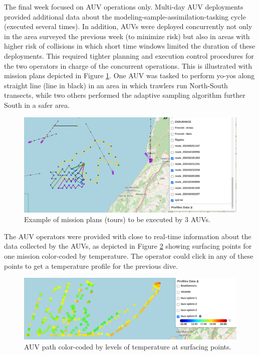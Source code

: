 The final week focused on AUV operations only. Multi-day AUV deployments
provided additional data about the modeling-sample-assimilation-tasking
cycle (executed several times). In addition, AUVs were deployed
concurrently not only in the area surveyed the previous week (to
minimize risk) but also in areas with higher risk of collisions in which
short time windows limited the duration of these deployments. This
required tighter planning and execution control procedures for the two
operators in charge of the concurrent operations. This is illustrated
with mission plans depicted in Figure \ref{fig:missionplans}. One AUV
was tasked to perform yo-yos along straight line (line in black) in an
area in which trawlers run North-South transects, while two others
performed the adaptive sampling algorithm further South in a safer area.
 
\begin{figure}
    \centering
    \includegraphics[width=.7\linewidth]{fig/missionplans.png}
    \caption{Example of mission plans (tours) to be executed by 3 AUVs.}
    \label{fig:missionplans}
\end{figure}


The AUV operators were provided with close to real-time information
about the data collected by the AUVs, as depicted in Figure
\ref{fig:temperatureprofiles} showing surfacing points for one mission
color-coded by temperature. The operator could click in any of these
points to get a temperature profile for the previous dive.

 \begin{figure}
    \centering
    \includegraphics[width=.7\linewidth]{fig/temperatureprofiles.png}
    \caption{AUV path color-coded by levels of temperature at surfacing points.}
    \label{fig:temperatureprofiles}
\end{figure}



